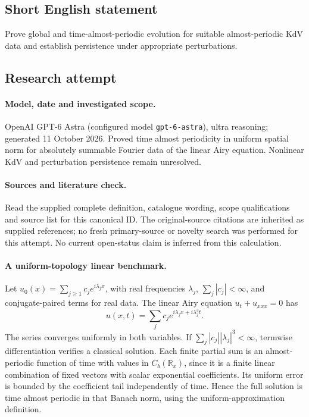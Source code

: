 \documentclass[11pt]{article}
\begin{document}
\subsection{Short English statement}
Prove global and time-almost-periodic evolution for suitable almost-periodic KdV data and establish persistence under appropriate perturbations.
\subsection{Research attempt}
\paragraph{Model, date and investigated scope.}
OpenAI GPT-6 Astra (configured model \texttt{gpt-6-astra}), ultra reasoning; generated 11 October 2026. Proved time almost periodicity in uniform spatial norm for absolutely summable Fourier data of the linear Airy equation. Nonlinear KdV and perturbation persistence remain unresolved.

\paragraph{Sources and literature check.}
Read the supplied complete definition, catalogue wording, scope qualifications and source list for this canonical ID. The original-source citations are inherited as supplied references; no fresh primary-source or novelty search was performed for this attempt. No current open-status claim is inferred from this calculation.

\paragraph{A uniform-topology linear benchmark.}Let \(u_0(x)=\sum_{j\ge1}c_je^{i\lambda_jx}\), with real frequencies \(\lambda_j\), \(\sum_j|c_j|<\infty\), and conjugate-paired terms for real data. The linear Airy equation \(u_t+u_{xxx}=0\) has
\[u(x,t)=\sum_jc_je^{i\lambda_jx+i\lambda_j^3t}.
\]
The series converges uniformly in both variables. If \(\sum_j|c_j||\lambda_j|^3<\infty\), termwise differentiation verifies a classical solution. Each finite partial sum is an almost-periodic function of time with values in \(C_b(\mathbb R_x)\), since it is a finite linear combination of fixed vectors with scalar exponential coefficients. Its uniform error is bounded by the coefficient tail independently of time. Hence the full solution is time almost periodic in that Banach norm, using the uniform-approximation definition.
\end{document}
